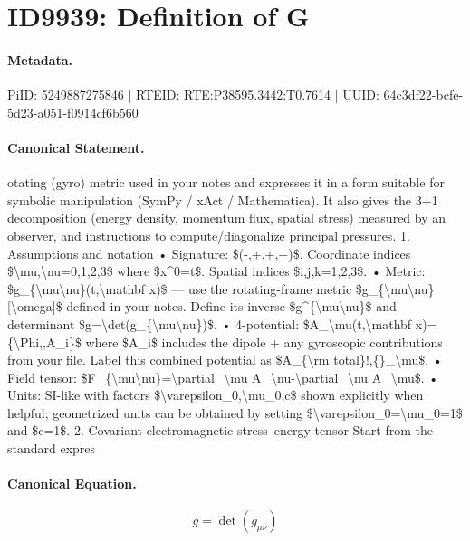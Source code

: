 \section*{ID9939: Definition of G}
\paragraph{Metadata.}
PiID: 5249887275846 | RTEID: RTE:P38595.3442:T0.7614 | UUID: 64c3df22-bcfe-5d23-a051-f0914cf6b560

\paragraph{Canonical Statement.}
otating (gyro) metric used in your notes and expresses it in a form suitable for symbolic manipulation (SymPy / xAct / Mathematica). It also gives the 3+1 decomposition (energy density, momentum flux, spatial stress) measured by an observer, and instructions to compute/diagonalize principal pressures. 1. Assumptions and notation • Signature: \$(-,+,+,+)\$. Coordinate indices \$\textbackslash{}mu,\textbackslash{}nu=0,1,2,3\$ where \$x\textasciicircum{}0=t\$. Spatial indices \$i,j,k=1,2,3\$. • Metric: \$g\_\{\textbackslash{}mu\textbackslash{}nu\}(t,\textbackslash{}mathbf x)\$ — use the rotating-frame metric \$g\_\{\textbackslash{}mu\textbackslash{}nu\}[\textbackslash{}omega]\$ defined in your notes. Define its inverse \$g\textasciicircum{}\{\textbackslash{}mu\textbackslash{}nu\}\$ and determinant \$g=\textbackslash{}det(g\_\{\textbackslash{}mu\textbackslash{}nu\})\$. • 4-potential: \$A\_\textbackslash{}mu(t,\textbackslash{}mathbf x)=\{\textbackslash{}Phi,,A\_i\}\$ where \$A\_i\$ includes the dipole + any gyroscopic contributions from your file. Label this combined potential as \$A\_\{\textbackslash{}rm total\}!,\{\}\_\textbackslash{}mu\$. • Field tensor: \$F\_\{\textbackslash{}mu\textbackslash{}nu\}=\textbackslash{}partial\_\textbackslash{}mu A\_\textbackslash{}nu-\textbackslash{}partial\_\textbackslash{}nu A\_\textbackslash{}mu\$. • Units: SI-like with factors \$\textbackslash{}varepsilon\_0,\textbackslash{}mu\_0,c\$ shown explicitly when helpful; geometrized units can be obtained by setting \$\textbackslash{}varepsilon\_0=\textbackslash{}mu\_0=1\$ and \$c=1\$. 2. Covariant electromagnetic stress–energy tensor Start from the standard expres

\paragraph{Canonical Equation.}
\[
g=\det(g_{\mu\nu})
\]

